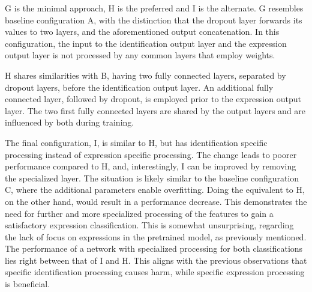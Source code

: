 


\noindent G is the minimal approach, H is the preferred and I is the alternate. G resembles baseline configuration A, with the distinction that the dropout layer forwards its values to two layers, and the aforementioned output concatenation. In this configuration, the input to the identification output layer and the expression output layer is not processed by any common layers that employ weights.


H shares similarities with B, having two fully connected layers, separated by dropout layers, before the identification output layer. An additional fully connected layer, followed by dropout, is employed prior to the expression output layer. The two first fully connected layers are shared by the output layers and are influenced by both during training. 


The final configuration, I, is similar to H, but has identification specific processing instead of expression specific processing. The change leads to poorer performance compared to H, and, interestingly, I can be improved by removing the specialized layer. The situation is likely similar to the baseline configuration C, where the additional parameters enable overfitting. Doing the equivalent to H, on the other hand, would result in a performance decrease. This demonstrates the need for further and more specialized processing of the features to gain a satisfactory expression classification. This is somewhat unsurprising, regarding the lack of focus on expressions in the pretrained model, as previously mentioned. The performance of a network with specialized processing for both classifications lies right between that of I and H. This aligns with the previous observations that specific identification processing causes harm, while specific expression processing is beneficial. \\

